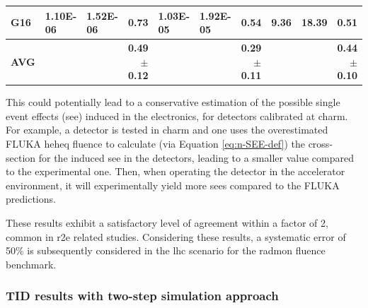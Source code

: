 \documentclass[encoding=utf8,british]{tumphthesis}
\begin{document}
\begin{table}[H]
\begin{subtable}{1\textwidth}
{\begin{tabular}{|l|llr|llr|llr|}
\rowcolor[HTML]{CFE2F3} 
\textbf{G16}                              & 1.10E-06                                             & 1.52E-06                                              & \textbf{0.73}                                    & 1.03E-05                                             & 1.92E-05                                              & \textbf{0.54}                                    & 9.36                                                 & 18.39                                                 & \textbf{0.51}                                    \\ \hline
\textbf{AVG}                             &                                                      &                                                       & \textbf{0.49$\pm$0.12}                           &                                                      &                                                       & \textbf{0.29$\pm$0.11}                           &                                                      &                                                       & \textbf{0.44$\pm$0.10}                          
\\ \hline
\end{tabular}}
\end{subtable}

\end{table}


This could potentially lead to a conservative estimation of the possible single event effects (\acrshort{see}) induced in the electronics, for detectors calibrated at \acrshort{charm}. For example, a detector is tested in \acrshort{charm} and one uses the overestimated FLUKA \acrshort{heheq} fluence to calculate (via Equation \ref{eq:n-SEE-def}) the cross-section for the induced \acrshort{see} in the detectors, leading to a smaller value compared to the experimental one. Then, when operating the detector in the accelerator environment, it will experimentally yield more \acrshort{see}s compared to the FLUKA predictions.

These results exhibit a satisfactory level of agreement within a factor of 2, common in \acrshort{r2e} related studies. Considering these results, a systematic error of 50\% is subsequently considered in the \acrshort{lhc} scenario for the \acrshort{radmon} fluence benchmark.

\subsubsection{TID results with two-step simulation approach}
\label{subsection:RadMON-TID-second-step-improvements}
\end{document}
